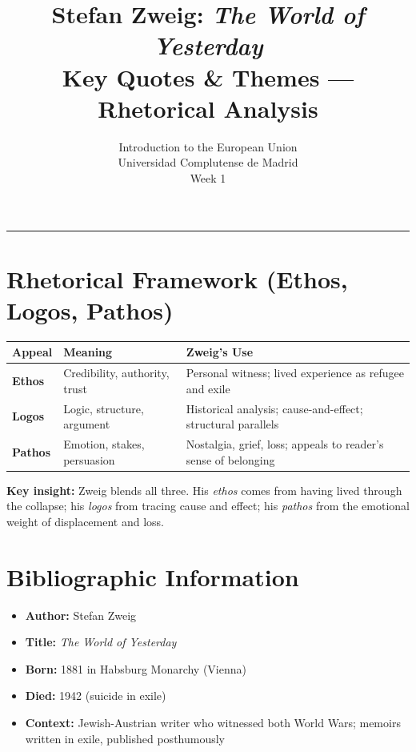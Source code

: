 \documentclass[11pt,a4paper]{article}
\begin{document}
\title{Stefan Zweig: \textit{The World of Yesterday}\\Key Quotes \& Themes --- Rhetorical Analysis}
\author{Introduction to the European Union\\Universidad Complutense de Madrid\\Week 1}
\date{}
\maketitle
\vspace{-1em}
\hrule
\vspace{1em}

\section*{Rhetorical Framework (Ethos, Logos, Pathos)}

\begin{table}[h]
\centering
\begin{tabular}{@{}lll@{}}
\toprule
\textbf{Appeal} & \textbf{Meaning} & \textbf{Zweig's Use} \\
\midrule
\textbf{Ethos} & Credibility, authority, trust & Personal witness; lived experience as refugee and exile \\
\textbf{Logos} & Logic, structure, argument & Historical analysis; cause-and-effect; structural parallels \\
\textbf{Pathos} & Emotion, stakes, persuasion & Nostalgia, grief, loss; appeals to reader's sense of belonging \\
\bottomrule
\end{tabular}
\end{table}

\textbf{Key insight:} Zweig blends all three. His \textit{ethos} comes from having lived through the collapse; his \textit{logos} from tracing cause and effect; his \textit{pathos} from the emotional weight of displacement and loss.

\section*{Bibliographic Information}

\begin{itemize}
\item \textbf{Author:} Stefan Zweig
\item \textbf{Title:} \textit{The World of Yesterday}
\item \textbf{Born:} 1881 in Habsburg Monarchy (Vienna)
\item \textbf{Died:} 1942 (suicide in exile)
\item \textbf{Context:} Jewish-Austrian writer who witnessed both World Wars; memoirs written in exile, published posthumously
\end{itemize}
\end{document}
